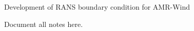 \documentclass{article}
\begin{document}
\begin{center}
{\Large{}Development of RANS boundary condition for
  AMR-Wind}{\Large\par} \par\end{center}

Document all notes here.
\end{document}
